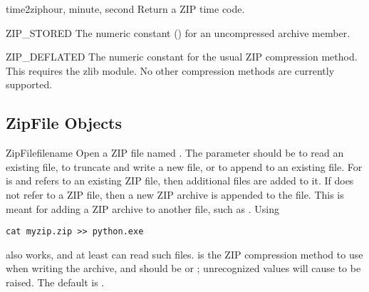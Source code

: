 \begin{funcdesc}{time2zip}{hour, minute, second}
  Return a ZIP time code.
\end{funcdesc}

\begin{datadesc}{ZIP_STORED}
  The numeric constant () for an uncompressed archive member.
\end{datadesc}

\begin{datadesc}{ZIP_DEFLATED}
  The numeric constant for the usual ZIP compression method.  This
  requires the zlib module.  No other compression methods are
  currently supported.
\end{datadesc}


\begin{seealso}

\end{seealso}


\subsection{ZipFile Objects \label{zipfile-objects}}

\begin{classdesc}{ZipFile}{filename} 
  Open a ZIP file named .  The  parameter
  should be  to read an existing file,  to
  truncate and write a new file, or  to append to an
  existing file.  For  is  and 
  refers to an existing ZIP file, then additional files are added to
  it.  If  does not refer to a ZIP file, then a new ZIP
  archive is appended to the file.  This is meant for adding a ZIP
  archive to another file, such as .  Using
\begin{verbatim}
cat myzip.zip >> python.exe
\end{verbatim}
  also works, and at least  can read such files.
   is the ZIP compression method to use when writing
  the archive, and should be  or
  ; unrecognized values will cause
   to be raised.  The default is
  . 
\end{classdesc}

